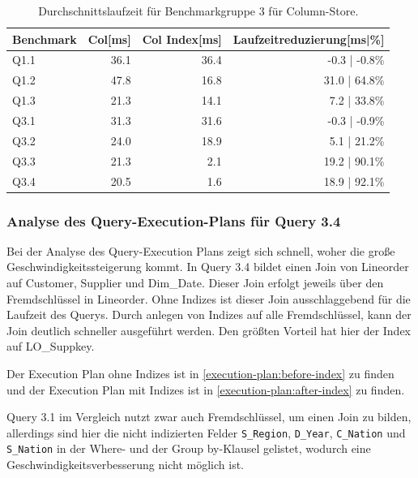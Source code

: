 \begin{table}[H]
    \centering
    \begin{tabularx}{13cm}{lrrr}
        \toprule
        Benchmark           & Col[ms]       & Col Index[ms] & Laufzeitreduzierung[ms|\%]   \\
        \toprule
        Q1.1                & 36.1          & 36.4          & -0.3 | -0.8\%                \\
        Q1.2                & 47.8          & 16.8          & 31.0 | 64.8\%                 \\
        Q1.3                & 21.3          & 14.1          & 7.2 | 33.8\%                \\
        Q3.1                & 31.3          & 31.6          & -0.3 | -0.9\%                \\
        Q3.2                & 24.0          & 18.9          & 5.1 | 21.2\%                 \\
        Q3.3                & 21.3          & 2.1           & 19.2 | 90.1\%                \\
        Q3.4                & 20.5          & 1.6           & 18.9 | 92.1\%                \\
        \bottomrule
    \end{tabularx}
\caption{Durchschnittslaufzeit für Benchmarkgruppe 3 für Column-Store.}
\end{table}

\subsubsection{Analyse des Query-Execution-Plans für Query 3.4}

Bei der Analyse des Query-Execution Plans zeigt sich schnell,
woher die große Geschwindigkeitssteigerung kommt.
In Query 3.4 bildet einen Join von Lineorder auf Customer,
Supplier und Dim\_Date. 
Dieser Join erfolgt jeweils über den Fremdschlüssel in Lineorder.
Ohne Indizes ist dieser Join ausschlaggebend für die Laufzeit des Querys.
Durch anlegen von Indizes auf alle Fremdschlüssel,
kann der Join deutlich schneller ausgeführt werden.
Den größten Vorteil hat hier der Index auf LO\_Suppkey.

Der Execution Plan ohne Indizes ist in \autoref{execution-plan:before-index}
zu finden und der Execution Plan mit Indizes ist in \autoref{execution-plan:after-index} zu finden.

Query 3.1 im Vergleich nutzt zwar auch Fremdschlüssel, um einen Join zu bilden,
allerdings sind hier die nicht indizierten Felder \verb+S_Region+, \verb+D_Year+,
\verb+C_Nation+ und \verb+S_Nation+ in der Where- und der Group by-Klausel gelistet,
wodurch eine Geschwindigkeitsverbesserung nicht möglich ist.


